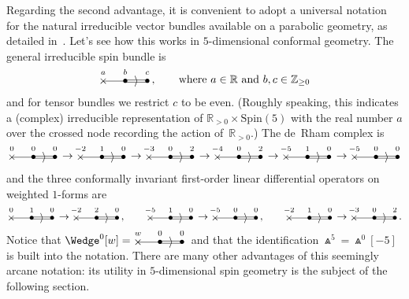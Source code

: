 \documentclass[10pt,a4paper]{amsart}
\numberwithin{equation}{section}
\newcommand{\bthree}[3]{\begin{picture}(48,11)
\put(4,1.5){\makebox(0,0){$\times$}}
\put(24,1.5){\makebox(0,0){$\bullet$}}
\put(44,1.5){\makebox(0,0){$\bullet$}}
\put(4,1.5){\line(1,0){20}}
\put(23,2.5){\line(1,0){20}}
\put(23,0.5){\line(1,0){20}}
\put(34,1.5){\makebox(0,0){$\rangle$}}
\put(4,10){\makebox(0,0){$\vphantom{(}\scriptstyle #1$}}
\put(24,10){\makebox(0,0){$\vphantom{(}\scriptstyle #2$}}
\put(44,10){\makebox(0,0){$\vphantom{(}\scriptstyle #3$}}
\end{picture}}
\begin{document}
Regarding the second advantage, it is convenient to adopt a universal notation
for the natural irreducible vector bundles available on a parabolic geometry,
as detailed in~\cite{BE,CS}. Let's see how this works in $5$-dimensional
conformal geometry. The general irreducible spin bundle is
\[\bthree{a}{b}{c},\qquad\mbox{where}\ a\in{\mathbb{R}}\
\mbox{and}\ b,c\in{\mathbb{Z}}_{\geq 0}\]
and for tensor bundles we restrict $c$ to be even. (Roughly speaking, this
indicates a (complex) irreducible representation of
${\mathbb{R}}_{>0}\times{\mathrm{Spin(5)}}$ with the real number $a$ over the
crossed node recording the action of~${\mathbb{R}}_{>0}$.) The de~Rham complex
is
\begin{equation}\label{deRham5dim}
\bthree{0}{0}{0}\to\bthree{-2}{1}{0}\to\bthree{-3}{0}{2}
\to\bthree{-4}{0}{2}\to\bthree{-5}{1}{0}\to\bthree{-5}{0}{0}\end{equation}
and the three conformally invariant first-order linear differential operators
on weighted $1$-forms are
\[\bthree{0}{1}{0}\to\bthree{-2}{2}{0},\qquad
\bthree{-5}{1}{0}\to\bthree{-5}{0}{0},\qquad
\bthree{-2}{1}{0}\to\bthree{-3}{0}{2}.\]
Notice that $\Wedge^0[w]=\bthree{w}{0}{0}$ and that the identification
$\Wedge^5=\Wedge^0[-5]$ is built into the notation. There are many other
advantages of this seemingly arcane notation: its utility in $5$-dimensional
spin geometry is the subject of the following section.
\end{document}
